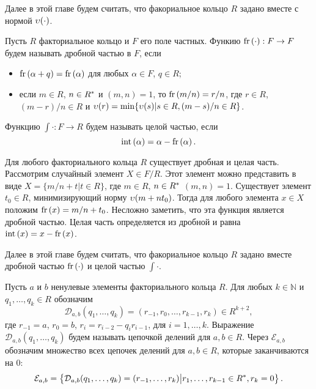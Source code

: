 \documentclass[_00_dissertation.tex]{subfiles}
\begin{document}
Далее в этой главе будем считать, что факориальное кольцо $R$ задано вместе с нормой $\upsilon(\cdot)$.

\begin{definition}
    Пусть $R$ факториальное кольцо и $F$ его поле частных.
    Функию $\textrm{fr}\left(\cdot\right): F \to F$ будем называть дробной частью в $F$, если
    \begin{itemize}
        \item $\textrm{fr}\left(\alpha + q\right) = \textrm{fr}\left(\alpha\right)$ для любых $\alpha \in F$, $q \in R$;

        \item если $m \in R$, $n \in R^{*}$ и $(m, n) = 1$, то $\textrm{fr}\left(m/n\right) = r/n$, где $r \in R$, $(m-r)/n \in R$ и $\upsilon(r) = \min \{\upsilon(s) | s \in R, (m-s)/n \in R\}$.
    \end{itemize}
    Функцию $\int{\cdot}: F \to R$ будем называть целой частью, если
    \begin{equation*}
        \textrm{int}\left(\alpha\right) = \alpha - \textrm{fr}\left(\alpha\right).
    \end{equation*}
\end{definition}

\begin{remark}\label{remark:easy_fr}
    Для любого факториального кольца $R$ существует дробная и целая часть.
    Рассмотрим случайный элемент $X \in F/R$.
    Этот элемент можно представить в виде $X = \{m/n + t | t \in R\}$, где $m \in R$, $n \in R^{*}$ $(m, n) = 1$.
    Существует элемент $t_0 \in R$, минимизирующий норму $\upsilon(m + n t_0)$.
    Тогда для любого элемента $x \in X$ положим $\textrm{fr}\left(x\right) = m/n + t_0$.
    Несложно заметить, что эта функция является дробной частью.
    Целая часть определяется из дробной и равна $\textrm{int}\left(x\right) = x - \textrm{fr}\left(x\right)$.
\end{remark}

Далее в этой главе будем считать, что факориальное кольцо $R$ задано вместе дробной частью $\textrm{fr}\left(\cdot\right)$ и целой частью $\int{\cdot}$.

\begin{definition}
    Пусть $a$ и $b$ ненулевые элементы факториального кольца $R$.
    Для любых $k \in \mathbb{N}$ и $q_1, \dots, q_k \in R$ обозначим
    \begin{equation*}
        \mathcal{D}_{a, b}(q_1, \dots, q_k) = (r_{-1}, r_0, \dots, r_{k-1}, r_k) \in R^{k+2},
    \end{equation*}
    где $r_{-1} = a$, $r_0 = b$, $r_i = r_{i-2} - q_i r_{i-1}$, для $i = 1, \dots, k$.
    Выражение $\mathcal{D}_{a, b}(q_1, \dots, q_k)$ будем называть цепочкой делений для $a, b \in R$.
    Через $\mathcal{E}_{a, b}$ обозначим множество всех цепочек делений для $a, b \in R$, которые заканчиваются на $0$:
    \begin{equation*}
        \mathcal{E}_{a, b} = \left\{
        \mathcal{D}_{a, b}(q_1, \dots, q_k) = (r_{-1}, \dots, r_k) \big| r_1, \dots, r_{k-1} \in R^{*}, r_k = 0
        \right\}.
    \end{equation*}
\end{definition}
\end{document}
